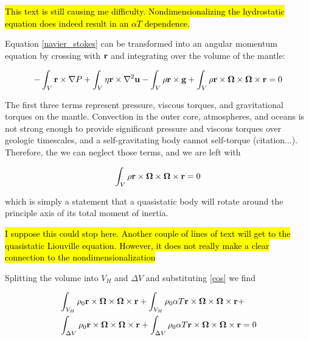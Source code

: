 \documentclass[extra,mreferee]{gji}
\begin{document}
\hl{This text is still causing me difficulty. Nondimensionalizing the hydrostatic equation does indeed result in an $\alpha T$ dependence.  }

Equation \ref{navier_stokes} can be transformed into an angular momentum equation by crossing with $\bf r$ and integrating over the volume of the mantle:

\begin{equation}
\begin{aligned}
-\int_V {\bf r} \times \nabla P + \int_V \eta {\bf r} \times \nabla^2 {\bf u} - \int_V \rho {\bf r \times g} + \int_V \rho {\bf r \times \mitbf{\Omega} \times \mitbf{\Omega} \times {\bf r }} &= 0 \\
\end{aligned}
\end{equation}


The first three terms represent pressure, viscous torques, and gravitational torques on the mantle.  
Convection in the outer core, atmospheres, and oceans is not strong enough to provide significant pressure and viscous torques over geologic timescales, and a self-gravitating body cannot self-torque (citation...).
Therefore, the we can neglect those terms, and we are left with

\begin{equation}
\begin{aligned}
\int_V \rho {\bf r \times \mitbf{\Omega} \times \mitbf{\Omega} \times {\bf r }} &= 0 \\
\end{aligned}
\end{equation}

which is simply a statement that a quasistatic body will rotate around the principle axis of its total moment of inertia.

\hl{I suppose this could stop here. Another couple of lines of text will get to the quasistatic Liouville equation.  However, it does not really make a clear connection to the nondimensionalization }

Splitting the volume into $V_H$ and $\Delta V$ and substituting \ref{eos} we find

\begin{equation}
\begin{aligned}
&\int_{V_H} \rho_0 {\bf r \times \mitbf{\Omega} \times \mitbf{\Omega} \times {\bf r }} + 
\int_{V_H} \rho_0 \alpha T {\bf r \times \mitbf{\Omega} \times \mitbf{\Omega} \times {\bf r }} +  \\
&\int_{\Delta V} \rho_0 {\bf r \times \mitbf{\Omega} \times \mitbf{\Omega} \times {\bf r }} + 
\int_{\Delta V} \rho_0 \alpha T {\bf r \times \mitbf{\Omega} \times \mitbf{\Omega} \times {\bf r }} = 0  \\
\end{aligned}
\end{equation}
\end{document}
